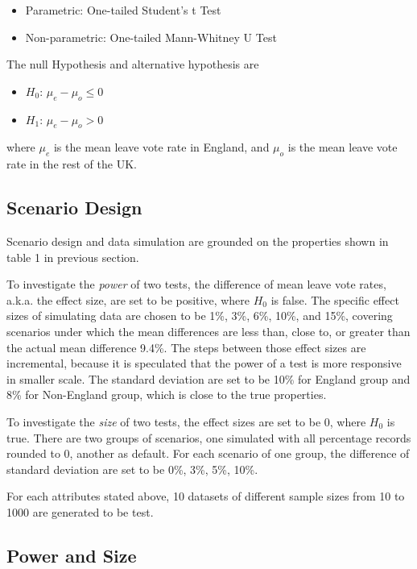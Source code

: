 \documentclass[]{article}
\begin{document}
\begin{itemize}
\item
  Parametric: One-tailed Student's t Test
\item
  Non-parametric: One-tailed Mann-Whitney U Test
\end{itemize}

The null Hypothesis and alternative hypothesis are

\begin{itemize}
\item
  \(H_0\): \(\mu_{e} - \mu_{o} \le 0\)
\item
  \(H_1\): \(\mu_{e} - \mu_{o} > 0\)
\end{itemize}

where \(\mu_{e}\) is the mean leave vote rate in England, and
\(\mu_{o}\) is the mean leave vote rate in the rest of the UK.

\hypertarget{scenario-design}{%
\subsection{Scenario Design}\label{scenario-design}}

Scenario design and data simulation are grounded on the properties shown
in table 1 in previous section.

To investigate the \emph{power} of two tests, the difference of mean
leave vote rates, a.k.a. the effect size, are set to be positive, where
\(H_0\) is false. The specific effect sizes of simulating data are
chosen to be 1\%, 3\%, 6\%, 10\%, and 15\%, covering scenarios under
which the mean differences are less than, close to, or greater than the
actual mean difference 9.4\%. The steps between those effect sizes are
incremental, because it is speculated that the power of a test is more
responsive in smaller scale. The standard deviation are set to be 10\%
for England group and 8\% for Non-England group, which is close to the
true properties.

To investigate the \emph{size} of two tests, the effect sizes are set to
be 0, where \(H_0\) is true. There are two groups of scenarios, one
simulated with all percentage records rounded to 0, another as default.
For each scenario of one group, the difference of standard deviation are
set to be 0\%, 3\%, 5\%, 10\%.

For each attributes stated above, 10 datasets of different sample sizes
from 10 to 1000 are generated to be test.

\hypertarget{power-and-size}{%
\subsection{Power and Size}\label{power-and-size}}
\end{document}
